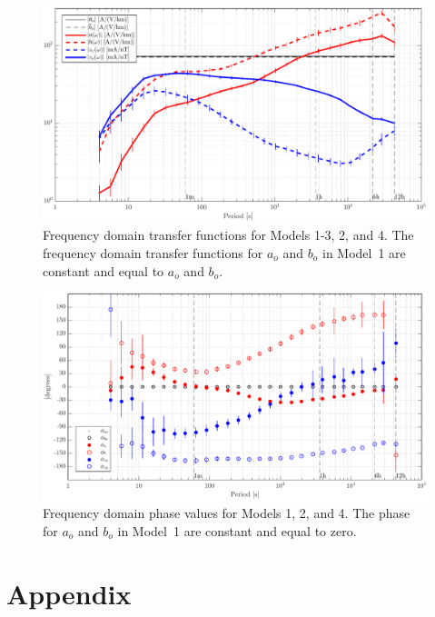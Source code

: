 \documentclass[draft,linenumbers]{agujournal2018}
\begin{document}
\begin{figure}[h]
\centering
\includegraphics[width=\textwidth]{figures/plot_model_summary_Z-options-1.pdf}
\caption{Frequency domain transfer functions for Models 1-3, 2, and 4. The frequency domain transfer functions for $a_o$ and $b_o$ in Model~1 are constant and equal to $a_o$ and $b_o$.}
\label{Z}
\end{figure}

\begin{figure}[h]
\centering
\includegraphics[width=\textwidth]{figures/plot_model_summary_Phi-options-1.pdf}
\caption{Frequency domain phase values for Models 1, 2, and 4. The phase for $a_o$ and $b_o$ in Model~1 are constant and equal to zero.}
\label{Phi}
\end{figure}

\clearpage

\appendix
\section{Appendix}

\end{document}
